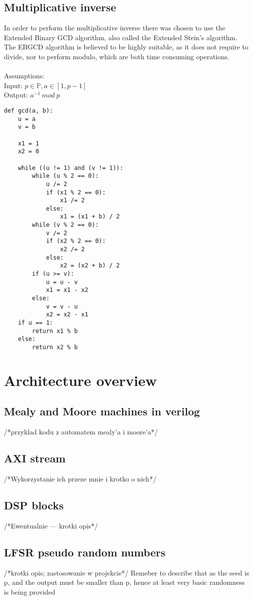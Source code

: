 \documentclass{report}
\begin{document}
\section{Multiplicative inverse}
In order to perform the multiplicative inverse there was chosen to use the Extended Binary GCD algorithm, also called the Extended Stein's algorithm. The EBGCD algorithm is believed to be highly suitable, as it does not require to divide, nor to perform modulo, which are both time consuming operations.\\ \\
Assumptions:\\
Input: $p \in\mathbb{P}, a\in[1,p-1]$\\
Output: $a^{-1}\: mod\: p$ \\
\begin{lstlisting}[caption=Binary multiplicative inverse algorithm]
def gcd(a, b):
    u = a
    v = b

    x1 = 1
    x2 = 0

    while ((u != 1) and (v != 1)):
        while (u % 2 == 0):
            u /= 2
            if (x1 % 2 == 0):
                x1 /= 2
            else:
                x1 = (x1 + b) / 2
        while (v % 2 == 0):
            v /= 2
            if (x2 % 2 == 0):
                x2 /= 2
            else:
                x2 = (x2 + b) / 2
        if (u >= v):
            u = u - v
            x1 = x1 - x2
        else:
            v = v - u
            x2 = x2 - x1
    if u == 1:
        return x1 % b
    else:
        return x2 % b
\end{lstlisting}
\chapter{Architecture overview}
\section{Mealy and Moore machines in verilog}
/*przyklad kodu z automatem mealy'a i moore'a*/
\section{AXI stream}
/*Wykorzystanie ich przeze mnie i krotko o nich*/
\section{DSP blocks}
/*Ewentualnie --- krotki opis*/
\section{LFSR pseudo random numbers}
/*krotki opis; zastosowanie w projekcie*/
Remeber to describe that as the seed is p, and the output must be smaller than p, hence at least very basic randomness is being provided
\end{document}

